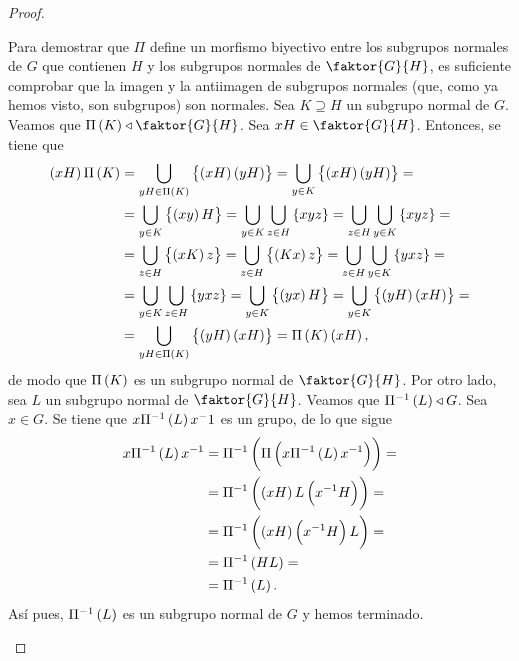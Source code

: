 \begin{proof}
\begin{enumerate}[i)]
            \noindent Para demostrar que $\Pi$ define un morfismo biyectivo entre los subgrupos normales de $G$ que contienen $H$ y los subgrupos normales de $\faktor{G}{H}$, es suficiente comprobar que la imagen y la antiimagen de subgrupos normales (que, como ya hemos visto, son subgrupos) son normales. Sea $K\supseteq H$ un subgrupo normal de $G$. Veamos que $\Pi\lp K\rp\triangleleft \faktor{G}{H}$. Sea $xH\in\faktor{G}{H}$. Entonces, se tiene que 
            \begin{align*}
                \left( xH\right) \Pi\left( K\right) &= \bigcup_{yH\in\Pi\left( K\right)}\left\{\left( xH\right)\left( yH\right)\right\} = \bigcup_{y\in K}\left\{\left( xH\right)\left( yH\right)\right\} =\\
                &= \bigcup_{y\in K}\left\{\left( xy\right) H\right\} = \bigcup_{y\in K}\bigcup_{z\in H}\left\{ xyz\right\} = \bigcup_{z\in H}\bigcup_{y\in K}\left\{ xyz\right\} =\\ 
                &= \bigcup_{z\in H}\left\{ \left( xK\right) z\right\} = \bigcup_{z\in H}\left\{ \left( Kx\right) z\right\} = \bigcup_{z\in H}\bigcup_{y\in K}\left\{ yxz\right\} =\\ 
                &= \bigcup_{y\in K}\bigcup_{z\in H}\left\{ yxz\right\} = \bigcup_{y\in K}\left\{\left( yx\right) H\right\} = \bigcup_{y\in K}\left\{\left( yH\right)\left( xH\right)\right\} =\\
                &= \bigcup_{yH\in \Pi\left( K\right)}\left\{\left( yH\right)\left( xH\right)\right\} = \Pi\left( K\right)\left( xH\right),
            \end{align*}    
            de modo que $\Pi\left( K\right)$ es un subgrupo normal de $\faktor{G}{H}$. Por otro lado, sea $L$ un subgrupo normal de $\faktor{G}{H}$. Veamos que $\Pi^{-1}\left( L\right)\triangleleft G$. Sea $x\in G$. Se tiene que $x\Pi^{-1}\left( L\right) x^-1$ es un grupo, de lo que sigue
            \begin{align*}
                x\Pi^{-1}\left( L\right) x^{-1} &= \Pi^{-1}\left( \Pi\left( x\Pi^{-1}\left( L\right) x^{-1}\right)\right) =\\
                &=\Pi^{-1}\left( \left( xH\right) L \left( x^{-1}H\right)\right) =\\
                &=\Pi^{-1}\left( \left( xH\right) \left( x^{-1}H\right) L\right) =\\
                &=\Pi^{-1}\left( HL\right) =\\
                &=\Pi^{-1}\left( L\right).
            \end{align*}
            Así pues, $\Pi^{-1}\left( L\right)$ es un subgrupo normal de $G$ y hemos terminado.
    \end{enumerate}
\end{proof}

